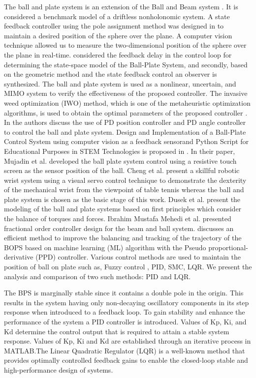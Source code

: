 \documentclass[conference]{IEEEtran}
\begin{document}
The ball and plate system is an extension of the Ball and Beam system \cite{b1}. It is considered a benchmark model of a driftless nonholonomic system. A state feedback controller using the pole assignment method was designed in \cite{b2} to maintain a desired position of the sphere over the plane. A computer vision technique allowed us to measure the two-dimensional position of the sphere over the plane in real-time. \cite{b3} considered the feedback delay in the control loop for determining the state-space model of the Ball-Plate System, and secondly, based on the geometric method and the state feedback control an observer is synthesized. The ball and plate system is used as a nonlinear, uncertain, and MIMO system to verify the effectiveness of the proposed controller.  The invasive weed optimization (IWO) method, which is one of the metaheuristic optimization algorithms, is used to obtain the optimal parameters of the proposed controller \cite{b4}. In \cite{b5} the authors discuss the use of PD position controller and PD angle controller to control the ball and plate system. Design and Implementation of a Ball-Plate Control System using computer vision as a feedback sensorand Python Script for Educational Purposes in STEM Technologies is proposed in \cite{b6}. In their paper, Mujadin et al. \cite{b7} developed the ball plate system control using a resistive touch screen as the sensor position of the ball.  Cheng et al. \cite{b8} present a skillful robotic wrist system using a visual servo control technique to demonstrate the dexterity of the mechanical wrist from the viewpoint of table tennis whereas the ball and plate system is chosen as the basic stage of this work. Dusek et al. \cite{b9} present the modeling of the ball and plate systems based on first principles which consider the balance of torques and forces.  Ibrahim Mustafa Mehedi et al. \cite{b10} presented fractional order controller design for the beam and ball system. \cite{b11} discusses an efficient method to improve the balancing and tracking of the trajectory of the BOPS based on machine learning (ML) algorithm with the Pseudo proportional-derivative (PPD) controller. 
Various control methods are used to maintain the position of ball on plate such as, Fuzzy control \cite{b12}, PID\cite{b13}, SMC\cite{b14}, LQR\cite{b15}. We present the analysis and comparison of two such methods: PID and LQR.

The  BPS is marginally stable since it contains a double pole in the origin. This results in the system having only non-decaying oscillatory components in its step response when introduced to a feedback loop. To gain stability and enhance the performance of the system a PID controller is introduced. Values of Kp, Ki, and Kd determine the control output that is required to attain a stable system response. Values of Kp, Ki and Kd are established through an iterative process in MATLAB.The Linear Quadratic Regulator (LQR) is a well-known method that provides optimally controlled feedback gains to enable the closed-loop stable and high-performance design of systems. 
\end{document}
